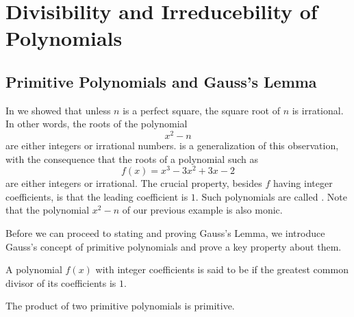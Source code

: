 \chapter{Divisibility and Irreducebility of Polynomials}\label{chapter:applications-polynomials}

\section{Primitive Polynomials and Gauss's Lemma}

In  we showed that unless $n$ is a perfect square, the square root of $n$ is irrational. In other words, the roots of the polynomial
\begin{equation*}
  x^2-n
\end{equation*}
are either integers or irrational numbers.  is a generalization of this observation, with the consequence that the roots of a polynomial such as
\begin{equation*}
  f(x)=x^3-3x^2+3x-2
\end{equation*}
are either integers or irrational. The crucial property, besides $f$ having integer coefficients, is that the leading coefficient is $1$. Such polynomials are called . Note that the polynomial $x^2-n$ of our previous example is also monic.

Before we can proceed to stating and proving Gauss's Lemma, we introduce Gauss's concept of primitive polynomials and prove a key property about them.

\begin{definition}
  A polynomial $f(x)$ with integer coefficients is said to be  if the greatest common divisor of its coefficients is $1$.
\end{definition}

\begin{theorem}
  The product of two primitive polynomials is primitive.
\end{theorem}

